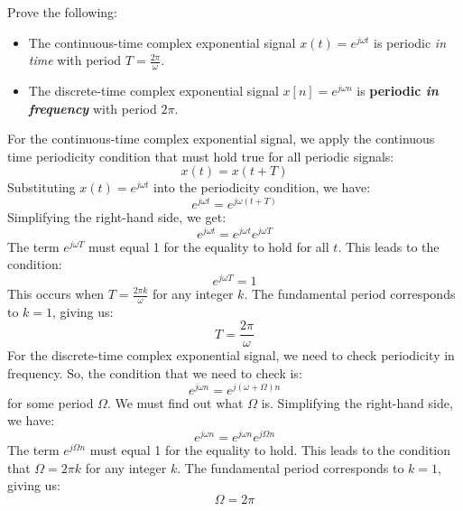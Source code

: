 \begin{popquiz}
    Prove the following:
    \begin{itemize}
        \item The continuous-time complex exponential signal $x(t) = e^{j \omega t}$ is periodic \emph{in time} with period $T = \frac{2\pi}{\omega}$.
        \item The discrete-time complex exponential signal $x[n] = e^{j \omega n}$ is \textbf{periodic \emph{in frequency}} with period $2\pi$.
    \end{itemize}
    \popqsplit 
    For the continuous-time complex exponential signal, we apply the continuous time periodicity condition that must hold true for all periodic signals:
    \[
    x(t) = x(t + T)
    \]
    Substituting \( x(t) = e^{j \omega t} \) into the periodicity condition, we have:
    \[
    e^{j \omega t} = e^{j \omega (t + T)}
    \]
    Simplifying the right-hand side, we get:
    \[
    e^{j \omega t} = e^{j \omega t} e^{j \omega T}
    \]
    The term $e^{j \omega T}$ must equal 1 for the equality to hold for all \( t \). This leads to the condition:
    \[
    e^{j \omega T} = 1
    \]
    This occurs when $T = \frac{2\pi k}{\omega}$ for any integer \( k \). The fundamental period corresponds to \( k = 1 \), giving us:
    \[
    T = \frac{2\pi}{\omega}
    \]
    For the discrete-time complex exponential signal, we need to check periodicity in frequency. So, the condition that we need to check is:
    \[
      e^{j \omega n} = e^{j (\omega + \Omega) n}
    \]
    for some period \( \Omega \). We must find out what \( \Omega \) is. Simplifying the right-hand side, we have:
    \[
      e^{j \omega n} = e^{j \omega n} e^{j \Omega n}
    \]
    The term $e^{j \Omega n}$ must equal 1 for the equality to hold. This leads to the condition that $\Omega = 2 \pi k$ for any integer \( k \). The fundamental period corresponds to \( k = 1 \), giving us:
    \[
      \Omega = 2\pi
    \]
\end{popquiz}

